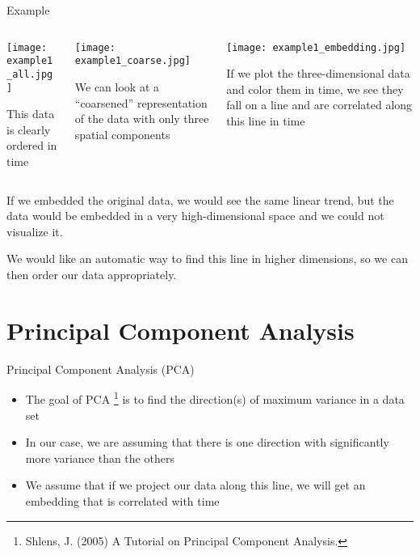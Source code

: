 \documentclass{beamer}
\begin{document}
\begin{frame}{Example}

    \begin{columns}[T]
        \begin{column}{0.3 \textwidth}
            \texttt{[image: example1\_all.jpg]}

            {\Tiny This data is clearly ordered in time \par}
        \end{column}

        \begin{column}{0.3 \textwidth}
            \texttt{[image: example1\_coarse.jpg]}

            {\Tiny We can look at a ``coarsened'' representation of the data with only three spatial components \par}
        \end{column}

        \begin{column}{0.3 \textwidth}
            \texttt{[image: example1\_embedding.jpg]}

            {\Tiny If we plot the three-dimensional data and color them in time, we see they fall on a line and are correlated along this line in time \par}
        \end{column}
    \end{columns}
    \vspace{0.1 in}

    \centering
   If we embedded the original data, we would see the same linear trend, but the data would be embedded in a very high-dimensional space and we could not visualize it.

   We would like an automatic way to find this line in higher dimensions, so we can then order our data appropriately.

\end{frame}

\section{Principal Component Analysis}

\begin{frame}{Principal Component Analysis (PCA)}
  \begin{itemize}
  \item The goal of PCA \footnote{\tiny Shlens, J. (2005) A Tutorial on Principal Component Analysis.} is to find the direction(s) of maximum variance in a data set
  \item In our case, we are assuming that there is one direction with significantly more variance than the others
  \item We assume that if we project our data along this line, we will get an embedding that is correlated with time
  \end{itemize}
\end{frame}
\end{document}
